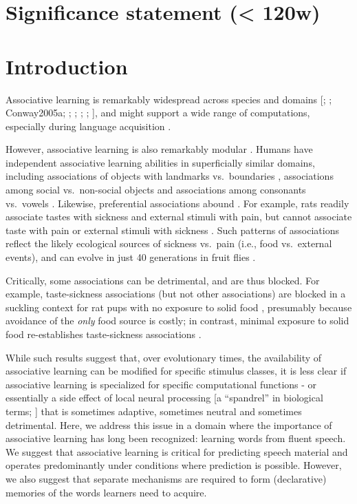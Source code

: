 \documentclass[
]{article}
\begin{document}
\section{Significance statement (\textless{}
120w)}\label{significance-statement-120w}

\section{Introduction}\label{introduction}

Associative learning is remarkably widespread across species and domains
{[}\citet{Aslin1998}; \citet{Chen2015}; Conway2005a; \citet{Fiser2002};
\citet{Hauser2001}; \citet{Saffran-Science}; \citet{Toro2005-backward};
\citet{Turk-Browne-reversal}{]}, and might support a wide range of
computations, especially during language acquisition
\citep{Aslin2012, Seidenberg2002}.

However, associative learning is also remarkably modular
\citep{Endress-duplications}. Humans have independent associative
learning abilities in superficially similar domains, including
associations of objects with landmarks vs.~boundaries
\citep{Doeller2008}, associations among social vs.~non-social objects
\citep{Tompson2019} and associations among consonants vs.~vowels
\citep{Bonatti2005}. Likewise, preferential associations abound
\citep{Seligman1970}. For example, rats readily associate tastes with
sickness and external stimuli with pain, but cannot associate taste with
pain or external stimuli with sickness \citep{Garcia1974}. Such patterns
of associations reflect the likely ecological sources of sickness
vs.~pain (i.e., food vs.~external events), and can evolve in just 40
generations in fruit flies \citep{Dunlap2014}.

Critically, some associations can be detrimental, and are thus blocked.
For example, taste-sickness associations (but not other associations)
are blocked in a suckling context for rat pups with no exposure to solid
food \citep{Martin1979, Alberts1984}, presumably because avoidance of
the \emph{only} food source is costly; in contrast, minimal exposure to
solid food re-establishes taste-sickness associations
\citep{Gubernick1984}.

While such results suggest that, over evolutionary times, the
availability of associative learning can be modified for specific
stimulus classes, it is less clear if associative learning is
specialized for specific computational functions - or essentially a side
effect of local neural processing {[}a ``spandrel'' in biological terms;
\citet{Gould1979}{]} that is sometimes adaptive, sometimes neutral and
sometimes detrimental. Here, we address this issue in a domain where the
importance of associative learning has long been recognized: learning
words from fluent speech. We suggest that associative learning is
critical for predicting speech material and operates predominantly under
conditions where prediction is possible. However, we also suggest that
separate mechanisms are required to form (declarative) memories of the
words learners need to acquire.
\end{document}
